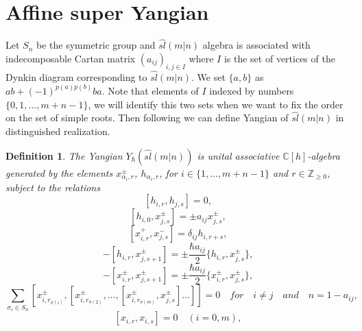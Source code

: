 \documentclass[english]{elsarticle}
\newtheorem{definition}{Definition}[section]
\numberwithin{equation}{section}
\begin{document}
\section{Affine super Yangian}

Let $S_n$ be the symmetric group and $\hat{sl}(m|n)$ algebra is associated with indecomposable Cartan matrix $(a_{ij})_{i,j \in I}$ where $I$ is the set of vertices of the Dynkin diagram corresponding to $\hat{sl}(m|n)$. We set $\{a,b\}$ as $ab + (-1)^{p(a)p(b)}ba$. Note that elements of $I$ indexed by numbers $\{0,1,\ldots,m+n-1\}$, we will identify this two sets when we want to fix the order on the set of simple roots. Then following \cite{Ueda} we can define Yangian of $\hat{sl}(m|n)$ in distinguished realization.
\begin{definition}
The Yangian $Y_\hbar(\hat{sl}(m|n))$ is unital associative $\mathbb{C}[h]$-algebra generated by the elements $x_{\alpha_{i},r}^{\pm}$, $h_{\alpha_{i},r}$, for $i \in \{1,\ldots,m+n-1 \}$ and $r \in \mathbb{Z}_{\geq 0}$, subject to the relations
\begin{equation}
\label{eq:8}
    [h_{{i},r},h_{{j},s}]=0,
\end{equation}
\begin{equation}
    \label{rel:1}
    [h_{{i},0},x_{{j},s}^{\pm}]=\pm a_{ij}x_{{j},s}^{\pm},
\end{equation}
\begin{equation}
\label{rel:2}
    [x_{{i},r}^{+},x_{{j},s}^{-}]=\delta_{ij}h_{{i},r+s},
\end{equation}
\begin{equation}
    [h_{{i},r+1},x_{{j},s}^{\pm}]-[h_{{i},r},x_{{j},s+1}^{\pm}]=\pm\frac{\hbar a_{ij}}{2}\{h_{{i},r},x_{{j},s}^{\pm}\},
\end{equation}
\begin{equation}
    [x_{{i},r+1}^{\pm},x_{{j},s}^{\pm}]-[x_{{i},r}^{\pm},x_{{j},s+1}^{\pm}]=\pm \frac{ \hbar a_{ij}}{2}\{x_{{i},r}^{\pm},x_{{j},s}^{\pm}\},
\end{equation}
\begin{equation}
    \sum\limits_{\sigma_i \in S_n}[x_{{i},r_{\sigma(i)}}^{\pm},[x_{{i},r_{\sigma(2)}}^{\pm},\ldots,[x_{{i},r_{\sigma(m)}}^{\pm},x_{{j},s}^{\pm}]\ldots]]=0 \quad for \quad i\neq j \quad and \quad n=1-a_{ij},
\end{equation}
\begin{equation}
\label{equ:17}
  [x_{{i},r},x_{{i},s}]=0 \quad (i=0,m),
\end{equation}
\begin{equation}

\end{equation}
\end{definition}
\end{document}
